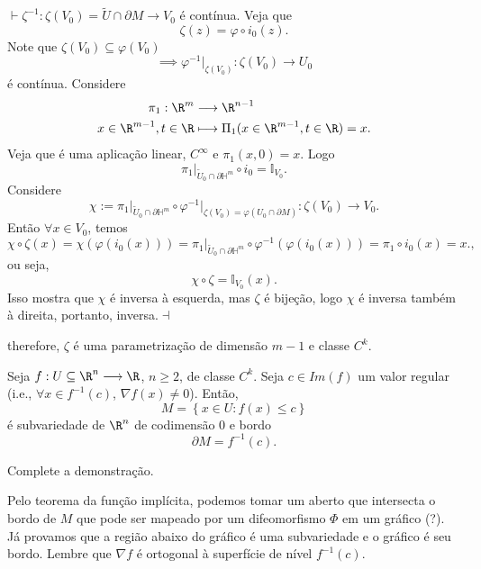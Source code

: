 $\vdash \zeta^{-1} : \zeta\left( V_0 \right) = \widetilde{U}\cap \partial M \longrightarrow V_0$ é contínua. Veja que \[
\zeta \left( z \right) = \varphi \circ i_0\left( z \right) 
.\] Note que $\zeta \left( V_0 \right) \subseteq \varphi \left( V_0 \right) $ \[
\implies \varphi ^{-1}\Big|_{\zeta\left( V_0 \right) } : \zeta\left( V_0 \right)  \longrightarrow U_0
\] é contínua. Considere
\begin{align*}
    \pi_1: \R^{m} &\longrightarrow \R^{n-1} \\
    x\in \R^{m-1},t\in \R &\longmapsto \Pi_1(x\in \R^{m-1},t\in \R) = x
.\end{align*}
Veja que é uma aplicação linear, $C^{\infty}$ e $\pi_1\left( x,0 \right) = x$. Logo \[
\pi_1\Big|_{\widetilde{U}_0 \cap \partial \mathbb{H}^{m}} \circ i_0 = \mathbb{I}_{V_0}
.\] Considere \[
\chi := \pi_1\Big|_{\widetilde{U}_0\cap \partial \mathbb{H}^{m}} \circ \varphi ^{-1}\Big|_{\zeta\left( V_0 \right) = \varphi \left( U_0\cap \partial M \right) }: \zeta\left( V_0 \right)  \longrightarrow V_0
.\] Então $\forall x\in V_0$, temos \[
\chi \circ \zeta\left( x \right) = \chi \left( \varphi \left( i_0\left( x \right)  \right)  \right) = \pi_1\Big|_{\widetilde{U}_0\cap \partial \mathbb{H}^{m}} \circ \varphi ^{-1} \left( \varphi \left( i_0\left( x \right)  \right)  \right) = \pi_1 \circ i_0 \left( x \right) = x.
,\] ou seja, \[
\chi \circ \zeta = \mathbb{I}_{V_0}\left( x \right) 
.\] Isso mostra que $\chi$ é inversa à esquerda, mas $\zeta$ é bijeção, logo $\chi$ é inversa também à direita, portanto, inversa.$\dashv$

therefore, $\zeta$ é uma parametrização de dimensão $m-1$ e classe $C^{k}$.

\begin{prop}
    Seja $f : U\subseteq\R^{n} \longrightarrow \R$, $n\ge 2$, de classe $C^{k}$. Seja $c\in Im\left( f \right) $ um valor regular (i.e., $\forall x\in f^{-1}\left( c \right) $, $\nabla f\left( x \right) \neq 0$). Então, \[
    M = \left\{ x \in U : f\left( x \right) \le c \right\} 
    \] é subvariedade de $\R^{n}$ de codimensão 0 e bordo \[
    \partial M = f^{-1}\left( c \right) 
    .\] 
\end{prop}
\begin{demo}
    \begin{problem}
	Complete a demonstração.
    \end{problem}

    Pelo teorema da função implícita, podemos tomar um aberto que intersecta o bordo de $M$ que pode ser mapeado por um difeomorfismo $\Phi$ em um gráfico (?). Já provamos que a região abaixo do gráfico é uma subvariedade e o gráfico é seu bordo. Lembre que $\nabla f$ é ortogonal à superfície de nível $f^{-1} \left( c \right) $.
\end{demo}

